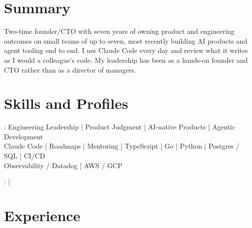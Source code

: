 \documentclass[print]{jack-resume}
\begin{document}
\pagecolor{darkmodeBackground}


\begin{minipage}[t][1cm][t]{.03\textwidth}
    \hfill
\end{minipage}

\section{Summary}
Two-time founder/CTO with seven years of owning product and engineering outcomes on small teams of up to seven, most recently building AI products and agent tooling end to end. I use Claude Code every day and review what it writes as I would a colleague's code. My leadership has been as a hands-on founder and CTO rather than as a director of managers.
\sectionsep

\section{Skills and Profiles}
:
Engineering Leadership \hfill | \hfill
Product Judgment \hfill | \hfill
AI-native Products \hfill | \hfill
Agentic Development \\
\hspace{1.0cm} Claude Code \hfill | \hfill
Roadmaps \hfill | \hfill
Mentoring \hfill | \hfill
TypeScript \hfill | \hfill
Go \hfill | \hfill
Python \hfill | \hfill
Postgres / SQL \hfill | \hfill
CI/CD \\
\hspace{1.0cm} Observability / Datadog \hfill | \hfill
AWS / GCP \\

\raggedright{
    :
      \href{https://www.linkedin.com/in/jack-sturtevant/}{ \ExternalLink} |
     \href{https://github.com/jacksturt}{ \ExternalLink}}

\section{Experience}
\end{document}
